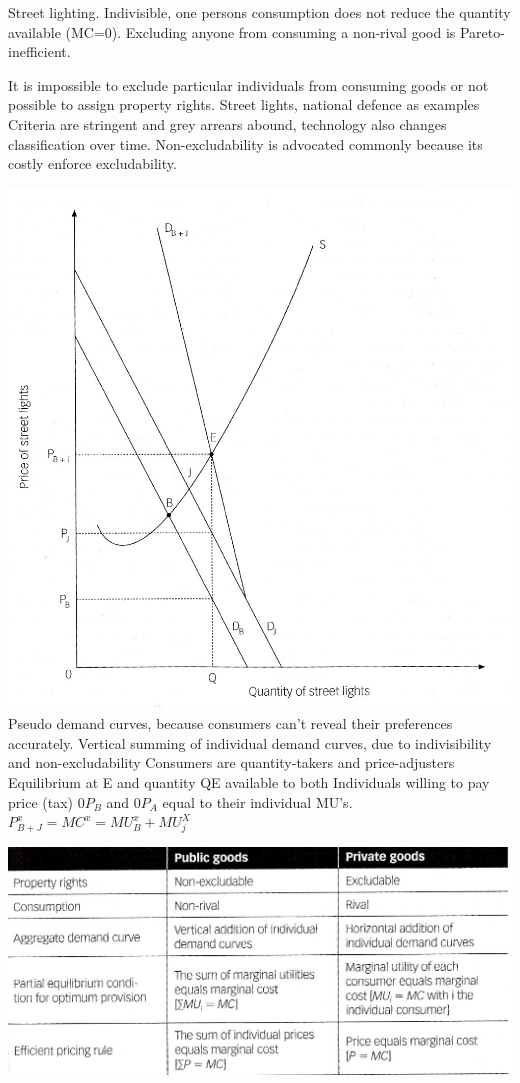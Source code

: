 \documentclass[12pt]{examnotes}
\begin{document}
\ra Street lighting.
 Indivisible, one persons consumption does not reduce the quantity available (MC=0). 
 Excluding anyone from consuming a non-rival good is Pareto-inefficient.

\ra  It is impossible to exclude particular individuals from consuming goods or not possible to assign property rights.
\ra Street lights, national defence as examples
\ra Criteria are stringent and grey arrears abound, technology also changes classification over time. 
\ra Non-excludability is advocated commonly because its costly enforce excludability.
 
\vspace{6pt}
\includegraphics[scale=0.3]{./imgs/32.jpg}
\ra Pseudo demand curves, because consumers can't reveal their preferences accurately.
\ra Vertical summing of individual demand curves, due to indivisibility and non-excludability 
\ra Consumers are quantity-takers and price-adjusters
\ra Equilibrium at E and quantity QE available to both
\ra Individuals willing to pay price (tax) $0P_B$ and  $0P_A$ equal to their individual MU's.
\ra $P^x_{B+J}=MC^x=MU^x_B+MU^X_j$

\includegraphics[scale=0.3]{./imgs/31t.jpg}
\end{document}
